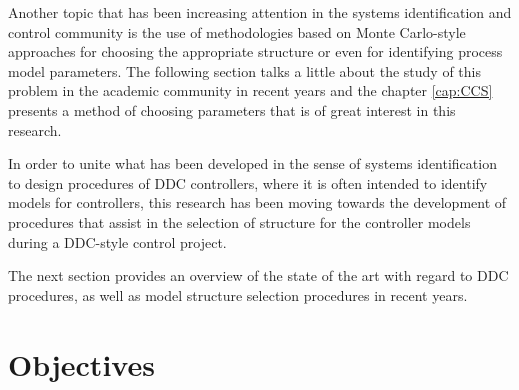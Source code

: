 Another topic that has been increasing attention in the systems identification and control community is the use of methodologies based on Monte Carlo-style approaches for choosing the appropriate structure or even for identifying process model parameters. The following section talks a little about the study of this problem in the academic community in recent years and the chapter \ref{cap:CCS} presents a method of choosing parameters that is of great interest in this research.

In order to unite what has been developed in the sense of systems identification to design procedures of DDC controllers, where it is often intended to identify models for controllers, this research has been moving towards the development of procedures that assist in the selection of structure for the controller models during a DDC-style control project.

The next section provides an overview of the state of the art with regard to DDC procedures, as well as model structure selection procedures in recent years.

\section{Objectives}%
\label{sec:objectives}

